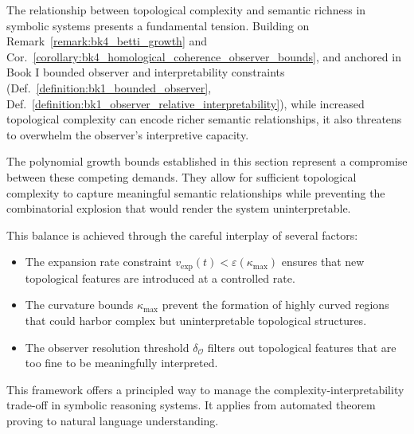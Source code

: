 \begin{scholium}
\label{scholium:bk4_topological_complexity_semantic_richness}
The relationship between topological complexity and semantic richness in symbolic systems presents a fundamental tension. Building on Remark~\ref{remark:bk4_betti_growth} and Cor.~\ref{corollary:bk4_homological_coherence_observer_bounds}, and anchored in Book I bounded observer and interpretability constraints (Def.~\ref{definition:bk1_bounded_observer}, Def.~\ref{definition:bk1_observer_relative_interpretability}), while increased topological complexity can encode richer semantic relationships, it also threatens to overwhelm the observer's interpretive capacity.

The polynomial growth bounds established in this section represent a compromise between these competing demands. They allow for sufficient topological complexity to capture meaningful semantic relationships while preventing the combinatorial explosion that would render the system uninterpretable.

This balance is achieved through the careful interplay of several factors:
\begin{itemize}
\item The expansion rate constraint $v_{\text{exp}}(t) < \varepsilon(\kappa_{\max})$ ensures that new topological features are introduced at a controlled rate.
\item The curvature bounds $\kappa_{\max}$ prevent the formation of highly curved regions that could harbor complex but uninterpretable topological structures.
\item The observer resolution threshold $\delta_{\mathcal{O}}$ filters out topological features that are too fine to be meaningfully interpreted.
\end{itemize}

This framework offers a principled way to manage the
complexity-interpretability trade-off in symbolic reasoning systems.
It applies from automated theorem proving to natural language understanding.
\end{scholium}

